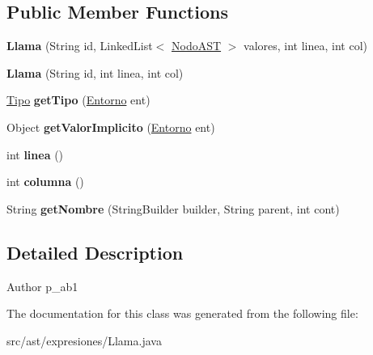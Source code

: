 \subsection*{Public Member Functions}
\begin{DoxyCompactItemize}
\item 
\mbox{\label{classast_1_1expresiones_1_1_llama_a13ba50844e13b1aeb20c80a13b8412ec}} 
{\bfseries Llama} (String id, Linked\+List$<$ \mbox{\hyperlink{interfaceast_1_1_nodo_a_s_t}{Nodo\+A\+ST}} $>$ valores, int linea, int col)
\item 
\mbox{\label{classast_1_1expresiones_1_1_llama_a270a9d03242a447da6fa77ff1da3ed5c}} 
{\bfseries Llama} (String id, int linea, int col)
\item 
\mbox{\label{classast_1_1expresiones_1_1_llama_a09a04149a1401bdbf56144c98f4155f9}} 
\mbox{\hyperlink{classentorno_1_1_tipo}{Tipo}} {\bfseries get\+Tipo} (\mbox{\hyperlink{classentorno_1_1_entorno}{Entorno}} ent)
\item 
\mbox{\label{classast_1_1expresiones_1_1_llama_afb1af91740ba7d388e8f237fb59755a3}} 
Object {\bfseries get\+Valor\+Implicito} (\mbox{\hyperlink{classentorno_1_1_entorno}{Entorno}} ent)
\item 
\mbox{\label{classast_1_1expresiones_1_1_llama_a162c95ba7e816fea2647a74f3618e078}} 
int {\bfseries linea} ()
\item 
\mbox{\label{classast_1_1expresiones_1_1_llama_ae4f9147f5e7874c0824d42de21975d34}} 
int {\bfseries columna} ()
\item 
\mbox{\label{classast_1_1expresiones_1_1_llama_afc370988a8403a8dd90436bdf640e75b}} 
String {\bfseries get\+Nombre} (String\+Builder builder, String parent, int cont)
\end{DoxyCompactItemize}


\subsection{Detailed Description}
\begin{DoxyAuthor}{Author}
p\+\_\+ab1 
\end{DoxyAuthor}


The documentation for this class was generated from the following file\+:\begin{DoxyCompactItemize}
\item 
src/ast/expresiones/Llama.\+java\end{DoxyCompactItemize}
